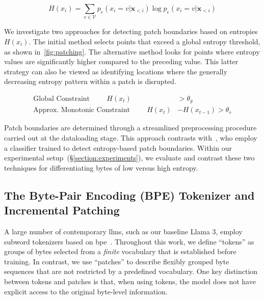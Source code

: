 \begin{equation}
H(x_i) = \sum_{v \in \mathcal{V}} p_{e}(x_i=v|\pmb{x}_{<i}) \log p_{e}(x_i=v|\pmb{x}_{<i})
\end{equation}

We investigate two approaches for detecting patch boundaries based on entropies $H(x_i)$. The initial method selects points that exceed a global entropy threshold, as shown in~\autoref{fig:patching}. The alternative method looks for points where entropy values are significantly higher compared to the preceding value. This latter strategy can also be viewed as identifying locations where the generally decreasing entropy pattern within a patch is disrupted.

\begin{align*}
    \text{Global Constraint}\hspace{1cm}H(x_t)& > \theta_g\\
    \text{Approx. Monotonic Constraint}\hspace{1cm}H(x_t)& - H(x_{t-1}) > \theta_r
\end{align*}

Patch boundaries are determined through a streamlined preprocessing procedure carried out at the dataloading stage. This approach contrasts with~\citet{nawrot-etal-2023-efficient}, who employ a classifier trained to detect entropy-based patch boundaries. Within our experimental setup~(\S\ref{section:experiments}), we evaluate and contrast these two techniques for differentiating bytes of low versus high entropy.

\subsection{The Byte-Pair Encoding (BPE) Tokenizer and Incremental Patching}
\label{section:incremental-patching}
\label{section:bpe-patch}

A large number of contemporary llms, such as our baseline Llama 3, employ subword tokenizers based on bpe~\citep{gage1994new, sennrich-etal-2016-neural}. Throughout this work, we define ``tokens'' as groups of bytes selected from a \textit{finite} vocabulary that is established before training. In contrast, we use ``patches'' to describe flexibly grouped byte sequences that are not restricted by a predefined vocabulary. One key distinction between tokens and patches is that, when using tokens, the model does not have explicit access to the original byte-level information.

